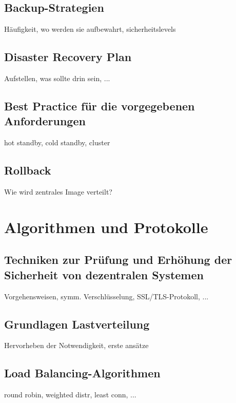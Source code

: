 \documentclass[letterpaper, 12pt]{article}
\let\tempsection\section
\renewcommand\section[1]{\vspace{-0.3cm}\tempsection{#1}\vspace{-0.3cm}}
\let\tempsubsection\subsection
\renewcommand\subsection[1]{\vspace{0cm}\tempsubsection{#1}\vspace{0cm}}
\begin{document}
\subsection{Backup-Strategien}

Häufigkeit, wo werden sie aufbewahrt, sicherheitslevels

\subsection{Disaster Recovery Plan}

Aufstellen, was sollte drin sein, ...

\subsection{Best Practice für die vorgegebenen Anforderungen}

hot standby, cold standby, cluster

\subsection{Rollback}

Wie wird zentrales Image verteilt?

\clearpage

\section{Algorithmen und Protokolle}

\subsection{Techniken zur Prüfung und Erhöhung der Sicherheit von dezentralen Systemen}

Vorgehensweisen, symm. Verschlüsselung, SSL/TLS-Protokoll, ...

\subsection{Grundlagen Lastverteilung}

Hervorheben der Notwendigkeit, erste ansätze

\subsection{Load Balancing-Algorithmen}

round robin, weighted distr, least conn, ...
\end{document}
